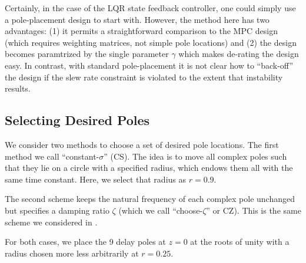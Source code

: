 \documentclass[journal,twocolumn,twoside]{IEEEtran}
\begin{document}
Certainly, in the case of the LQR state feedback controller, one could simply use a pole-placement design to start with. However, the method here has two advantages: (1) it permits a straightforward comparison to the MPC design (which requires weighting matrices, not simple pole locations) and (2) the design becomes paramtrized by the single parameter $\gamma$ which makes de-rating the design easy. In contrast, with standard pole-placement it is not clear how to ``back-off'' the design if the slew rate constraint is violated to the extent that instability results. 


\subsection{Selecting Desired Poles}
We consider two methods to choose a set of desired pole locations. The first method we call ``constant-$\sigma$'' (CS). The idea is to move all complex poles such that they lie on a circle with a specified radius, which endows them all with the same time constant. Here, we select that radius as $r=0.9$.

The second scheme keeps the natural frequency of each complex pole unchanged but specifies a damping ratio $\zeta$ (which we call ``choose-$\zeta$'' or CZ). This is the same scheme we considered in \cite{braker_fast_2017, braker_application_2017}.

For both cases, we place the 9 delay poles at $z=0$ at the roots of unity with a radius chosen more less arbitrarily at $r=0.25$. 
\end{document}
